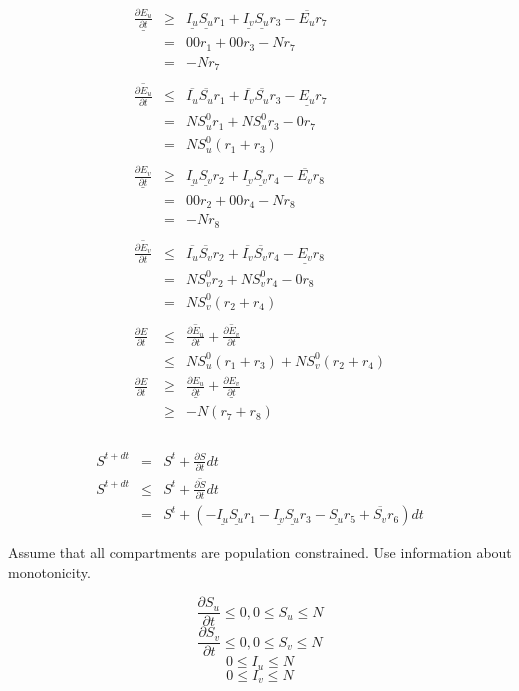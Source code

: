 \begin{eqnarray*}
    \underline{\frac{\partial E_u}{\partial t}} &\geq&   \underline{I_u} \underline{S_u} r_1 + \underline{I_v} \underline{S_u} r_3 - \overline{E_u} r_7\\
    &=&  0 0  r_1 + 0 0 r_3 - N r_7\\
    &=&  - N r_7\\
    \\
    \overline{\frac{\partial E_u}{\partial t}} &\leq& \overline{I_u} \overline{S_u} r_1 + \overline{I_v} \overline{S_u} r_3 - \underline{E_u} r_7\\
    &=&  N S_u^0 r_1 + N S_u^0 r_3 - 0 r_7\\
    &=&  N S_u^0 (r_1 + r_3)\\
    \\
    \underline{\frac{\partial E_v}{\partial t}} &\geq&  \underline{I_u} \underline{S_v} r_2 + \underline{I_v} \underline{S_v} r_4 - \overline{E_v} r_8\\
    &=&  0 0 r_2 + 0 0  r_4 -N r_8\\
    &=&  -N r_8\\
    \\
    \overline{\frac{\partial E_v}{\partial t}} &\leq&  \overline{I_u} \overline{S_v} r_2 + \overline{I_v} \overline{S_v} r_4 - \underline{E_v} r_8\\
    &=&  N S_v^0 r_2 +N S_v^0 r_4 - 0 r_8\\
    &=&  N S_v^0 (r_2 + r_4)\\
    \\
    \frac{\partial E}{\partial t} &\leq& \overline{\frac{\partial E_u}{\partial t}}  + \overline{\frac{\partial E_v}{\partial t}}\\
    &\leq& N S_u^0 (r_1 + r_3) +N S_v^0 (r_2 + r_4)\\
    \frac{\partial E}{\partial t} &\geq& \underline{\frac{\partial E_u}{\partial t}}  + \underline{\frac{\partial E_v}{\partial t}}\\
    &\geq& - N (r_7 + r_8)\\
    \\
\end{eqnarray*}

\begin{eqnarray*}
    S^{t+dt} &=& S^t + \frac{\partial S}{\partial t}dt\\
    S^{t+dt} &\leq& S^t + \overline{\frac{\partial S}{\partial t}}dt\\
    &=& S^t + (- \underline{I_u} \underline{S_u} r_1 - \underline{I_v} \underline{S_u} r_3 - \underline{S_u} r_5 + \overline{S_v} r_6)dt
\end{eqnarray*}

Assume that all compartments are population constrained.  Use information about monotonicity.

\[\frac{\partial S_u}{\partial t} \leq 0, 0 \leq S_u \leq N\]
\[\frac{\partial S_v}{\partial t} \leq 0, 0 \leq S_v \leq N\]
\[ 0 \leq I_u \leq N\]
\[ 0 \leq I_v \leq N\]